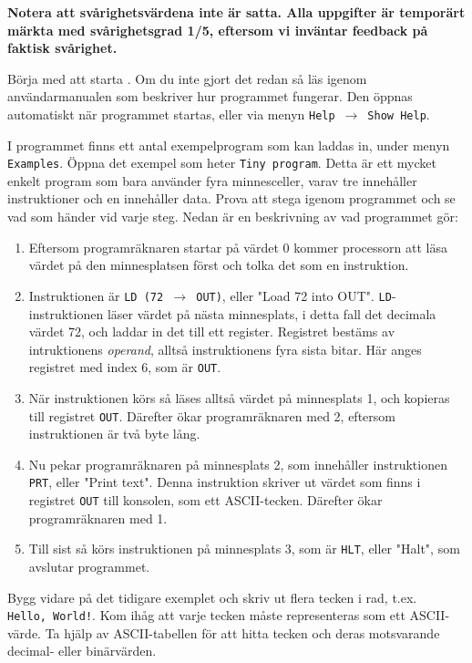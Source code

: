 \halfblankline
\noindent\textbf{Notera att svårighetsvärdena inte är satta. Alla uppgifter är temporärt märkta med svårighetsgrad 1/5, eftersom vi inväntar feedback på faktisk svårighet.}

\begin{Datorarbete}
    \item {} Börja med att starta \progname{}. Om du inte gjort det redan så läs igenom användarmanualen som beskriver hur programmet fungerar. Den öppnas automatiskt när programmet startas, eller via menyn \texttt{Help}~$\rightarrow$~\texttt{Show Help}.

    \item {} I programmet finns ett antal exempelprogram som kan laddas in, under menyn \texttt{Examples}. Öppna det exempel som heter \texttt{Tiny program}. Detta är ett mycket enkelt program som bara använder fyra minnesceller, varav tre innehåller instruktioner och en innehåller data. Prova att stega igenom programmet och se vad som händer vid varje steg. Nedan är en beskrivning av vad programmet gör:
    \begin{enumerate}
        \item Eftersom programräknaren startar på värdet 0 kommer processorn att läsa värdet på den minnesplatsen först och tolka det som en instruktion.
        \item Instruktionen är \texttt{LD (72 $\rightarrow$ OUT)}, eller "Load 72 into OUT". \texttt{LD}-instruktionen läser värdet på nästa minnesplats, i detta fall det decimala värdet 72, och laddar in det till ett register. Registret bestäms av intruktionens \emph{operand}, alltså instruktionens fyra sista bitar. Här anges registret med index 6, som är \texttt{OUT}.
        \item När instruktionen körs så läses alltså värdet på minnesplats 1, och kopieras till registret \texttt{OUT}. Därefter ökar programräknaren med 2, eftersom instruktionen är två byte lång.
        \item Nu pekar programräknaren på minnesplats 2, som innehåller instruktionen \texttt{PRT}, eller "Print text". Denna instruktion skriver ut värdet som finns i registret \texttt{OUT} till konsolen, som ett ASCII-tecken. Därefter ökar programräknaren med 1.
        \item Till sist så körs instruktionen på minnesplats 3, som är \texttt{HLT}, eller "Halt", som avslutar programmet.
    \end{enumerate}

    \item {} Bygg vidare på det tidigare exemplet och skriv ut flera tecken i rad, t.ex. \texttt{Hello,~World!}. Kom ihåg att varje tecken måste representeras som ett ASCII-värde. Ta hjälp av ASCII-tabellen för att hitta tecken och deras motsvarande decimal- eller binärvärden.


\end{Datorarbete}
